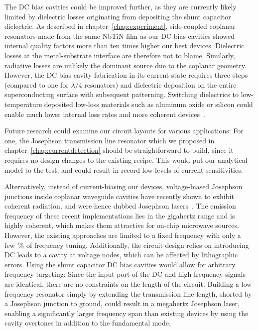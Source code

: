The DC bias cavities could be improved further, as they are currently likely limited by dielectric losses originating from depositing the shunt capacitor dielectric.
%
As described in chapter~\ref{chap:experiment}, side-coupled coplanar resonators made from the same NbTiN film as our DC bias cavities showed internal quality factors more than ten times higher our best devices.
%
Dielectric losses at the metal-substrate interface are therefore not to blame.
%
Similarly, radiative losses are unlikely the dominant source due to the coplanar geometry.
%
However, the DC bias cavity fabrication in its current state requires three steps (compared to one for $\lambda/4$ resonators) and dielectric deposition on the entire superconducting surface with subsequent patterning.
%
Switching dielectrics to low-temperature deposited low-loss materials such as aluminum oxide or silicon could enable much lower internal loss rates and more coherent devices~\cite{adamyanTunableSuperconductingMicrostrip2016}.

Future research could examine our circuit layouts for various applications:
%
For one, the Josephson transmission line resonator which we proposed in chapter~\ref{chap:currentdetection} should be straightforward to build, since it requires no design changes to the existing recipe.
%
This would put our analytical model to the test, and could result in record low levels of current sensitivities.

Alternatively, instead of current-biasing our devices, voltage-biased Josephson junctions inside coplanar waveguide cavities have recently shown to exhibit coherent radiation, and were hence dubbed Josephson lasers~\cite{chenRealizationSingleCooperpairJosephson2014c,cassidyDemonstrationAcJosephson2017e}.
%
The emission frequency of these recent implementations lies in the gigahertz range and is highly coherent, which makes them attractive for on-chip microwave sources.
%
However, the existing approaches are limited to a fixed frequency with only a few~\si{\percent} of frequency tuning.
%
Additionally, the circuit design relies on introducing DC leads to a cavity at voltage nodes, which can be affected by lithographic errors.
%
Using the shunt capacitor DC bias cavities would allow for arbitrary frequency targeting:
%
Since the input port of the DC and high frequency signals are identical, there are no constraints on the length of the circuit.
%
Building a low-frequency resonator simply by extending the transmission line length, shorted by a Josephson junction to ground, could result in a megahertz Josephson laser, enabling a significantly larger frequency span than existing devices by using the cavity overtones in addition to the fundamental mode.

